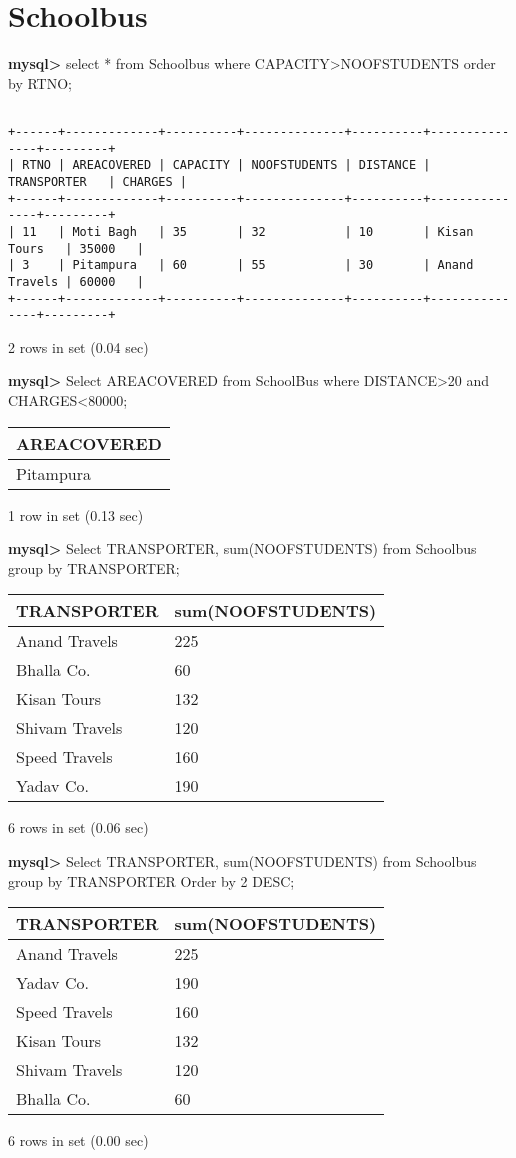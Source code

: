 \documentclass[11pt]{article}
\begin{document}
\section{Schoolbus}
\label{sec:orge313513}
\textbf{mysql>} select * from Schoolbus where CAPACITY>NOOFSTUDENTS order by RTNO;
\begin{verbatim}

+------+-------------+----------+--------------+----------+---------------+---------+
| RTNO | AREACOVERED | CAPACITY | NOOFSTUDENTS | DISTANCE | TRANSPORTER   | CHARGES |
+------+-------------+----------+--------------+----------+---------------+---------+
| 11   | Moti Bagh   | 35       | 32           | 10       | Kisan Tours   | 35000   |
| 3    | Pitampura   | 60       | 55           | 30       | Anand Travels | 60000   |
+------+-------------+----------+--------------+----------+---------------+---------+

\end{verbatim}
2 rows in set (0.04 sec)

\textbf{mysql>} Select AREACOVERED from SchoolBus where DISTANCE>20 and CHARGES<80000;
\begin{center}
\begin{tabular}{|l|}
\hline
AREACOVERED \\
\hline
Pitampura \\
\hline
\end{tabular}
\end{center}
1 row in set (0.13 sec)

\textbf{mysql>} Select TRANSPORTER, sum(NOOFSTUDENTS) from Schoolbus group by TRANSPORTER;
\begin{center}
\begin{tabular}{|l|l|}
\hline
TRANSPORTER & sum(NOOFSTUDENTS) \\
\hline
Anand Travels & 225 \\
Bhalla Co. & 60 \\
Kisan Tours & 132 \\
Shivam Travels & 120 \\
Speed Travels & 160 \\
Yadav Co. & 190 \\
\hline
\end{tabular}
\end{center}
6 rows in set (0.06 sec)

\textbf{mysql>} Select TRANSPORTER, sum(NOOFSTUDENTS) from Schoolbus group by TRANSPORTER Order by 2 DESC;
\begin{center}
\begin{tabular}{|l|l|}
\hline
TRANSPORTER & sum(NOOFSTUDENTS) \\
\hline
Anand Travels & 225 \\
Yadav Co. & 190 \\
Speed Travels & 160 \\
Kisan Tours & 132 \\
Shivam Travels & 120 \\
Bhalla Co. & 60 \\
\hline
\end{tabular}
\end{center}
6 rows in set (0.00 sec)
\end{document}
